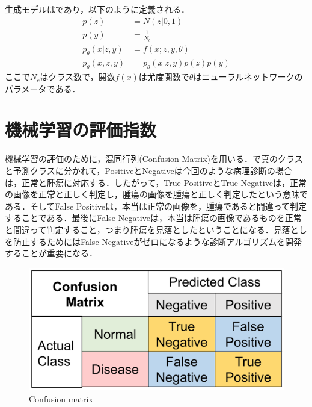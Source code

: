 生成モデルはであり，以下のように定義される．
\begin{align}\label{eq:m2_generative}
p(z) & = N (z| 0, 1)  \\
p(y) & = \frac{1}{N_c} \\
p_\theta (x|z, y) & = f(x; z, y, \theta) \\
p_\theta (x, z, y) & = p_\theta (x|z, y) p(z) p(y)
\end{align}
ここで$N_c$はクラス数で，関数$f(x)$は尤度関数で$\theta$はニューラルネットワークのパラメータである．

\section{機械学習の評価指数}
機械学習の評価のために，混同行列(Confusion Matrix)を用いる．で真のクラスと予測クラスに分かれて，PositiveとNegativeは今回のような病理診断の場合は，正常と腫瘍に対応する．したがって，True PositiveとTrue Negativeは，正常の画像を正常と正しく判定し，腫瘍の画像を腫瘍と正しく判定したという意味である．そしてFalse Positiveは，本当は正常の画像を，腫瘍であると間違って判定することである．最後にFalse Negativeは，本当は腫瘍の画像であるものを正常と間違って判定すること，つまり腫瘍を見落としたということになる．見落としを防止するためにはFalse Negativeがゼロになるような診断アルゴリズムを開発することが重要になる．

\begin{figure}[H]
	\centering
	\includegraphics[width=0.7\linewidth]{fig/chapter2/confusion_matrix}
	\caption{Confusion matrix}
	\label{fig:confusionmatrix}
\end{figure}

